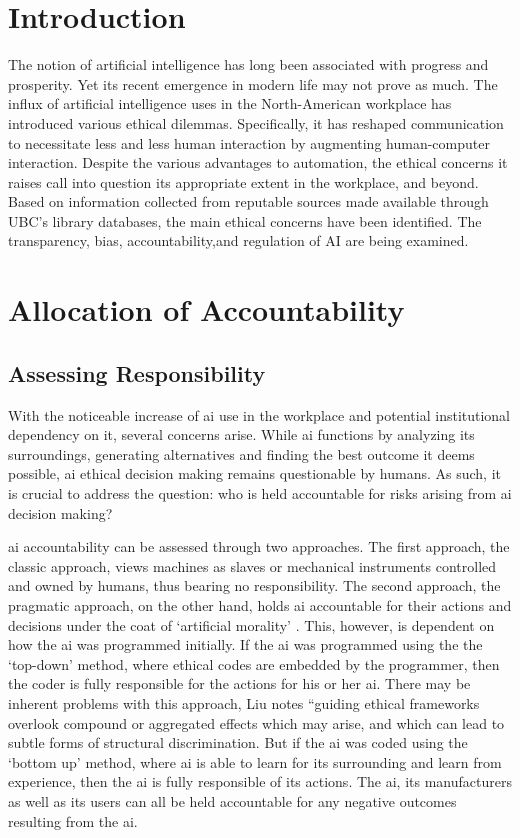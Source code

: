\documentclass{report}
\begin{document}
\newpage

\section{Introduction}
The notion of artificial intelligence has long been associated with progress and prosperity. 
Yet its recent emergence in modern life may not prove as much. 
The influx of artificial intelligence uses in the North-American workplace has introduced various ethical dilemmas. 
Specifically, it has reshaped communication to necessitate less and less human interaction by augmenting human-computer interaction. 
Despite the various advantages to automation, the ethical concerns it raises call into question its appropriate extent in the workplace, and beyond. 
Based on information collected from reputable sources made available through UBC’s library databases, the main ethical concerns have been identified. 
The transparency, bias, accountability,and regulation of AI are being examined. 


\section{Allocation of Accountability}
\subsection{Assessing Responsibility}
With the noticeable increase of \ac{ai} use in the workplace and potential institutional dependency on it, several concerns arise. 
While \ac{ai} functions by analyzing its surroundings, generating alternatives and finding the best outcome it deems possible, \ac{ai} ethical decision making remains questionable by humans. 
As such, it is crucial to address the question: who is held accountable for risks arising from \ac{ai} decision making? 

\ac{ai} accountability can be assessed through two approaches. 
The first approach, the classic approach, views machines as slaves or mechanical instruments controlled and owned by humans, thus bearing no responsibility. 
The second approach, the pragmatic approach, on the other hand, holds \ac{ai} accountable for their actions and decisions under the coat of `artificial morality' \citep{alaieri2016}. 
This, however, is dependent on how the \ac{ai} was programmed initially. 
If the \ac{ai} was programmed using the the `top-down' method, where ethical codes are embedded by the programmer, then the coder is fully responsible for the actions for his or her \ac{ai}. 
There may be inherent problems with this approach, Liu notes ``guiding ethical frameworks overlook compound or aggregated effects which may arise, and which can lead to subtle forms of structural discrimination\citep[p.~1]{liu2017}. %
But if the \ac{ai} was coded using the `bottom up' method, where \ac{ai} is able to learn for its surrounding and learn from experience, then the \ac{ai} is fully responsible of its actions. 
The \ac{ai}, its manufacturers as well as its users can all be held accountable for any negative outcomes resulting from the \ac{ai}. 
\end{document}
